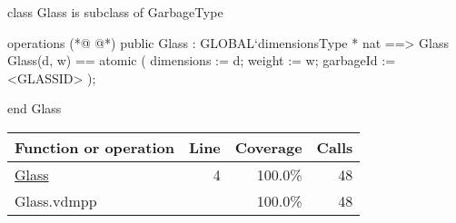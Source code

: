 \begin{vdmpp}[breaklines=true]
class Glass is subclass of GarbageType

operations
(*@
\label{Glass:4}
@*)
public Glass : GLOBAL`dimensionsType * nat ==> Glass
Glass(d, w) == 
    atomic 
    (
        dimensions := d;
        weight := w;
        garbageId := <GLASSID>
    );

end Glass
\end{vdmpp}
\bigskip
\begin{longtable}{|l|r|r|r|}
\hline
Function or operation & Line & Coverage & Calls \\
\hline
\hline
\hyperref[Glass:4]{Glass} & 4&100.0\% & 48 \\
\hline
\hline
Glass.vdmpp & & 100.0\% & 48 \\
\hline
\end{longtable}

